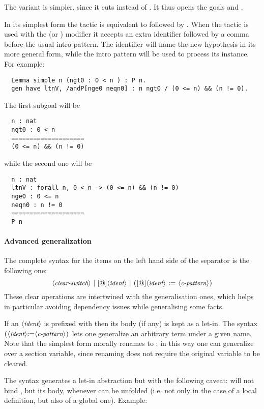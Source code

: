 The  variant is simpler, since it cuts
 instead of . It thus 
opens the goals  and .

In its simplest form
the  tactic
is equivalent to  followed by .
When the  tactic
is used with the  (or ) modifier it accepts an
extra identifier followed by a comma before the usual intro pattern.
The identifier will name the new hypothesis in its more general form,
while the intro pattern will be used to process its instance.  For example:
\begin{lstlisting}
  Lemma simple n (ngt0 : 0 < n ) : P n.
  gen have ltnV, /andP[nge0 neqn0] : n ngt0 / (0 <= n) && (n != 0).
\end{lstlisting}
The first subgoal will be
\begin{lstlisting}
  n : nat
  ngt0 : 0 < n
  ====================
  (0 <= n) && (n != 0)
\end{lstlisting}
while the second one will be
\begin{lstlisting}
  n : nat
  ltnV : forall n, 0 < n -> (0 <= n) && (n != 0)
  nge0 : 0 <= n
  neqn0 : n != 0
  ====================
  P n
\end{lstlisting}

\paragraph{Advanced generalization}\label{par:advancedgen}
The complete syntax for the items on the left hand side of the \C{/}
separator is the following one:
$$
\N{clear-switch}\ |\ [\C{@}]\N{ident}\ |\ \C{(}[\C{@}]\N{ident}\ \C{:=}\ \N{c-pattern}\C{)}
$$
These clear operations are intertwined with the generalisation ones, which
helps in particular avoiding dependency issues while generalising some facts.

\noindent
If an $\langle\mbox{\itshape\rmfamily\small ident}\rangle$ is prefixed with  then its body (if any) is kept as
a let-in.  The syntax $\C{(}\N{ident}\C{:=}\N{c-pattern}\C{)}$ lets one
generalize an arbitrary term under a given name.  Note that the simplest
form  morally renames  to ; in this way one can
generalize over a section variable, since renaming does not require
the original variable to be cleared.  

\noindent
The syntax  generates a let-in abstraction but with the following
caveat:  will not bind , but its body, whenever  can be
unfolded (i.e. not only in the case of a local definition, but also of a
global one).  Example:

